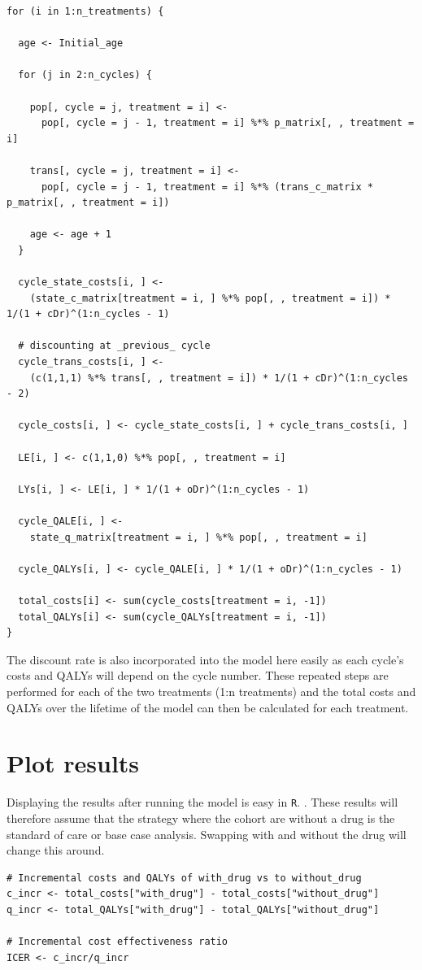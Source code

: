 \documentclass[a4paper,twoside,openany]{../svmonoBUGS}\usepackage[]{graphicx}\usepackage[]{color}
\newcommand{\R}{{\texttt{R}}\xspace}
\begin{document}
\begin{verbatim}
for (i in 1:n_treatments) {
  
  age <- Initial_age
  
  for (j in 2:n_cycles) {
    
    pop[, cycle = j, treatment = i] <-
      pop[, cycle = j - 1, treatment = i] %*% p_matrix[, , treatment = i]
    
    trans[, cycle = j, treatment = i] <-
      pop[, cycle = j - 1, treatment = i] %*% (trans_c_matrix * p_matrix[, , treatment = i])
    
    age <- age + 1
  }
  
  cycle_state_costs[i, ] <-
    (state_c_matrix[treatment = i, ] %*% pop[, , treatment = i]) * 1/(1 + cDr)^(1:n_cycles - 1)
  
  # discounting at _previous_ cycle
  cycle_trans_costs[i, ] <-
    (c(1,1,1) %*% trans[, , treatment = i]) * 1/(1 + cDr)^(1:n_cycles - 2)
  
  cycle_costs[i, ] <- cycle_state_costs[i, ] + cycle_trans_costs[i, ]
  
  LE[i, ] <- c(1,1,0) %*% pop[, , treatment = i]
  
  LYs[i, ] <- LE[i, ] * 1/(1 + oDr)^(1:n_cycles - 1)
  
  cycle_QALE[i, ] <-
    state_q_matrix[treatment = i, ] %*% pop[, , treatment = i]
  
  cycle_QALYs[i, ] <- cycle_QALE[i, ] * 1/(1 + oDr)^(1:n_cycles - 1)
  
  total_costs[i] <- sum(cycle_costs[treatment = i, -1])
  total_QALYs[i] <- sum(cycle_QALYs[treatment = i, -1])
}
\end{verbatim}
The discount rate is also incorporated into the model here easily as each cycle’s costs and QALYs will depend on the cycle number. These repeated steps are performed for each of the two treatments (1:n treatments) and the total costs and QALYs over the lifetime of the model can then be calculated for each treatment.

%
\section{Plot results}
Displaying the results after running the model is easy in \R. . These results will therefore assume that the strategy where the cohort are without a drug is the standard of care or base case analysis. Swapping with and without the drug will change this around.

\begin{verbatim}
# Incremental costs and QALYs of with_drug vs to without_drug
c_incr <- total_costs["with_drug"] - total_costs["without_drug"]
q_incr <- total_QALYs["with_drug"] - total_QALYs["without_drug"]

# Incremental cost effectiveness ratio 
ICER <- c_incr/q_incr
\end{verbatim}
\end{document}
